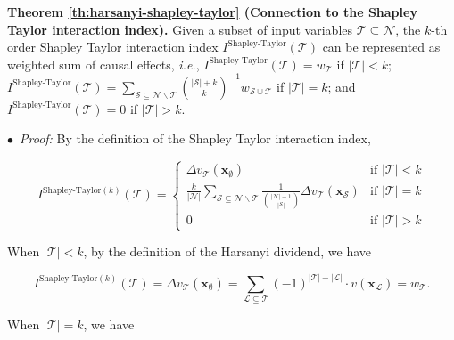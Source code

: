 \vspace{5pt}
\noindent\textbf{Theorem \ref{th:harsanyi-shapley-taylor} (Connection to the Shapley Taylor interaction index).}
Given a subset of input variables {\small $\mathcal{T}\subseteq \mathcal{N}$}, the {\small$k$}-th order Shapley Taylor interaction index {\small $I^{\textrm{Shapley-Taylor}}(\mathcal{T})$} can be represented as weighted sum of causal effects, \emph{i.e.}, {\small $I^{\textrm{Shapley-Taylor}}(\mathcal{T})=w_{\mathcal{T}}$} if {\small $|\mathcal{T}|<k$}; {\small $I^{\textrm{Shapley-Taylor}}(\mathcal{T})=\sum_{\mathcal{S}\subseteq \mathcal{N}\backslash \mathcal{T}}\binom{|\mathcal{S}|+k}{k}^{-1}w_{\mathcal{S}\cup \mathcal{T}}$} if {\small $|\mathcal{T}|=k$}; and {\small $I^{\textrm{Shapley-Taylor}}(\mathcal{T})=0$ if $|\mathcal{T}|>k$}.


$\bullet$~\textit{Proof:} By the definition of the Shapley Taylor interaction index,


\begin{small}
\begin{equation*}
I^{\textrm{Shapley-Taylor}(k)}(\mathcal{T})=\left\{
\begin{array}{ll}
    \Delta v_\mathcal{T}(\boldsymbol{x}_{\emptyset}) & \text{if } |\mathcal{T}|<k \\[5pt]
    \frac{k}{|\mathcal{N}|}\sum_{\mathcal{S}\subseteq \mathcal{N}\backslash \mathcal{T}}\frac{1}{\binom{|\mathcal{N}|-1}{|\mathcal{S}|}}\Delta v_\mathcal{T}(\boldsymbol{x}_{\mathcal{S}}) & \text{if } |\mathcal{T}|=k\\
    0 & \text{if } |\mathcal{T}|>k
\end{array}
\right.
\end{equation*}
\end{small}

When {\small$|\mathcal{T}|<k$}, by the definition of the Harsanyi dividend, we have


\begin{small}
\begin{equation*}
I^{\textrm{Shapley-Taylor}(k)}(\mathcal{T})=\Delta v_\mathcal{T}(\boldsymbol{x}_{\emptyset})=\sum_{\mathcal{\mathcal{L}}\subseteq \mathcal{\mathcal{T}}}(-1)^{|\mathcal{T}|-|\mathcal{L}|}\cdot  v(\boldsymbol{x}_{\mathcal{L}}) = w_{\mathcal{T}} .
\end{equation*}
\end{small}

When {\small$|\mathcal{T}|=k$}, we have


